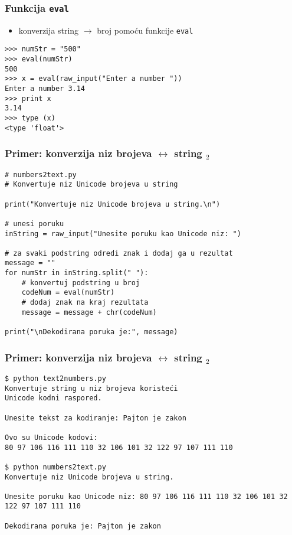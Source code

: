 \documentclass[utf8,compress]{beamer}
\begin{document}
\begin{frame}[fragile]
  \frametitle{Funkcija \texttt{eval}}
  \begin{itemize}
    \item konverzija string $\rightarrow$ broj pomoću funkcije \texttt{eval}
  \end{itemize}
\begin{verbatim}
>>> numStr = "500"
>>> eval(numStr)
500
>>> x = eval(raw_input("Enter a number "))
Enter a number 3.14
>>> print x
3.14
>>> type (x)
<type 'float'>
\end{verbatim}
\end{frame}

\begin{frame}[fragile,shrink=10]
  \frametitle{Primer: konverzija niz brojeva $\leftrightarrow$ string $_2$}
\begin{verbatim}
# numbers2text.py
# Konvertuje niz Unicode brojeva u string

print("Konvertuje niz Unicode brojeva u string.\n")

# unesi poruku
inString = raw_input("Unesite poruku kao Unicode niz: ")

# za svaki podstring odredi znak i dodaj ga u rezultat
message = ""
for numStr in inString.split(" "):
    # konvertuj podstring u broj
    codeNum = eval(numStr)
    # dodaj znak na kraj rezultata
    message = message + chr(codeNum) 

print("\nDekodirana poruka je:", message)
\end{verbatim}
\end{frame}

\begin{frame}[fragile,shrink=10]
  \frametitle{Primer: konverzija niz brojeva $\leftrightarrow$ string $_2$}
\begin{verbatim}
$ python text2numbers.py
Konvertuje string u niz brojeva koristeći
Unicode kodni raspored.

Unesite tekst za kodiranje: Pajton je zakon

Ovo su Unicode kodovi:
80 97 106 116 111 110 32 106 101 32 122 97 107 111 110

$ python numbers2text.py
Konvertuje niz Unicode brojeva u string.

Unesite poruku kao Unicode niz: 80 97 106 116 111 110 32 106 101 32 122 97 107 111 110

Dekodirana poruka je: Pajton je zakon
\end{verbatim}
\end{frame}
\end{document}
